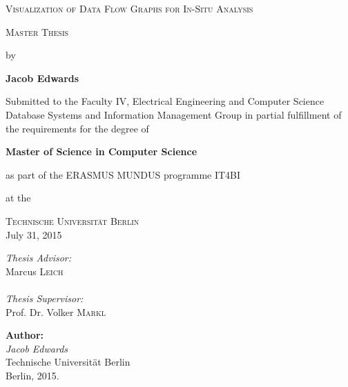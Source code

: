 \documentclass[%
   a4paper,%
  11pt,                    %
  oneside,
  openright,              %
  headsepline,          %
  cleardoubleempty,
  chapterprefix,
  titlepage,%
  liststotoc,%
  bibtotoc,%
  idxtotoc,%
  headinclude,           %
  pointlessnumbers,%
  USenglish
  ]{scrbook}
\theoremstyle{break}
\begin{document}
\begin{titlepage}
\begin{center}
 
\vspace*{1.5cm}
 
\LARGE
\textsc{Visualization of Data Flow Graphs for In-Situ Analysis}
 
\vspace{1cm}
 
\Large \textsc{Master Thesis}
 
\vspace{0.2cm}
 
by
 
\vspace{0.4cm}
 
 
\textbf{Jacob Edwards}
 
\vspace{1.0cm}
 
\vfill
 
\large 
Submitted to the Faculty IV, Electrical Engineering and Computer Science
Database Systems and Information Management Group
in partial fulfillment of the requirements for the degree of
 
\textbf{Master of Science in Computer Science}
 
as part of the ERASMUS MUNDUS programme IT4BI
 
at the 
 
\textsc{Technische Universit\"{a}t Berlin} \\
 
July 31, 2015
 
\vfill
 
\begin{flushright} 
\normalsize 
\emph{Thesis Advisor:}\\
Marcus \textsc{Leich} \\
 
\ \\
 
\emph{Thesis Supervisor:}\\
Prof. Dr. Volker \textsc{Markl}\\
\end{flushright}
 
 
\end{center}
\end{titlepage}


\vspace*{\fill}
\begin{minipage}{15cm}
\textbf{Author:}\\
\emph{Jacob Edwards}\\Technische Universität Berlin\\
Berlin, 2015.
\end{minipage}
\newpage
\end{document}
